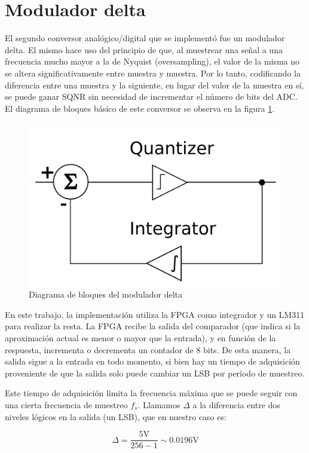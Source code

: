 \documentclass[assd_tp3_main.tex]{subfiles}
\begin{document}
\section{Modulador delta}

El segundo conversor anal\'ogico/digital que se implement\'o fue un modulador delta. El mismo hace uso del principio de que, al muestrear una se\~nal a una frecuencia mucho mayor a la de Nyquist (oversampling), el valor de la misma no se altera significativamente entre muestra y muestra. Por lo tanto, codificando la diferencia entre una muestra y la siguiente, en lugar del valor de la muestra en s\'i, se puede ganar SQNR sin necesidad de incrementar el n\'umero de bits del ADC. El diagrama de bloques b\'asico de este conversor se observa en la figura \ref{fig:delta-bloques}.

\begin{figure}[htb]
	\centering
	\includegraphics[width=0.6 \textwidth]
	{imagenes/ej3/delta-bloques.png}
	\caption{Diagrama de bloques del modulador delta}
	\label{fig:delta-bloques}
\end{figure}

En este trabajo, la implementaci\'on utiliza la FPGA como integrador y un LM311 para realizar la resta. La FPGA recibe la salida del comparador (que indica si la aproximaci\'on actual es menor o mayor que la entrada), y en funci\'on de la respuesta, incrementa o decrementa un contador de 8 bits. De esta manera, la salida sigue a la entrada en todo momento, si bien hay un tiempo de adquisici\'on proveniente de que la salida solo puede cambiar un LSB por per\'iodo de muestreo.

Este tiempo de adquisici\'on limita la frecuencia m\'axima que se puede seguir con una cierta frecuencia de muestreo $f_s$. Llamamos $\Delta$ a la diferencia entre dos niveles l\'ogicos en la salida (un LSB), que en nuestro caso es:

\begin{equation}
	\Delta = \frac{5\mathrm{V}}{256-1} \sim 0.0196\mathrm{V}
	\label{eq:lsb}
\end{equation}
\end{document}
